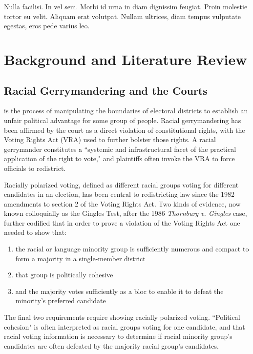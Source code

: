 \begin{savequote}[75mm]
Nulla facilisi. In vel sem. Morbi id urna in diam dignissim feugiat. Proin molestie tortor eu velit. Aliquam erat volutpat. Nullam ultrices, diam tempus vulputate egestas, eros pede varius leo.
\end{savequote}

\chapter{Background and Literature Review}

\section{Racial Gerrymandering and the Courts}

 is the process of manipulating the boundaries of electoral districts to establish an unfair political advantage for some group of people. Racial gerrymandering has been affirmed by the court as a direct violation of constitutional rights, with the Voting Rights Act (VRA) used to further bolster those rights. A racial gerrymander constitutes a ``systemic and infrastructural facet of the practical application of the right to vote,"\cite{greiner} and plaintiffs often invoke the VRA to force officials to redistrict.

Racially polarized voting, defined as different racial groups voting for different candidates in an election, has been central to redistricting law since the 1982 amendments to section 2 of the Voting Rights Act.\cite{greiner} Two kinds of evidence, now known colloquially as the Gingles Test, after the 1986 \textit{Thornburg v. Gingles}\cite{thornburg} case, further codified that in order to prove a violation of the Voting Rights Act one needed to show that:

\begin{enumerate}
 \item the racial or language minority group is sufficiently numerous and compact to form a majority in a single-member district
 \item that group is politically cohesive
 \item and the majority votes sufficiently as a bloc to enable it to defeat the minority’s preferred candidate
\end{enumerate}

The final two requirements require showing racially polarized voting. ``Political cohesion" is often interpreted as racial groups voting for one candidate, and that racial voting information is necessary to determine if racial minority group's candidates are often defeated by the majority racial group's candidates.

